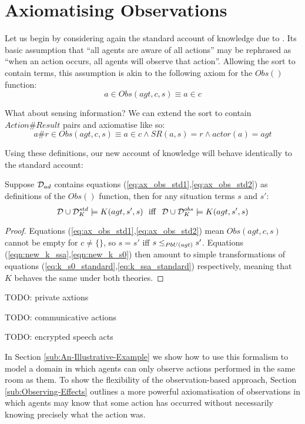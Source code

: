 \section{Axiomatising Observations}

Let us begin by considering again the standard account of knowledge
due to \citep{scherl03sc_knowledge}. Its basic assumption that {}``all
agents are aware of all actions'' may be rephrased as {}``when an
action occurs, all agents will observe that action''. Allowing the
 sort to contain  terms, this assumption
is akin to the following axiom for the $Obs()$ function:\begin{equation}
a\in Obs(agt,c,s)\equiv a\in c\label{eq:ax_obs_std1}\end{equation}


What about sensing information? We can extend the 
sort to contain $Action\#Result$ pairs and axiomatise like so:\begin{equation}
a\#r\in Obs(agt,c,s)\equiv a\in c\wedge SR(a,s)=r\wedge actor(a)=agt\label{eq:ax_obs_std2}\end{equation}


Using these definitions, our new account of knowledge will behave
identically to the standard account:

\begin{thm}
Suppose $\mathcal{D}_{ad}$ contains equations (\ref{eq:ax_obs_std1},\ref{eq:ax_obs_std2})
as definitions of the $Obs()$ function, then for any situation terms
$s$ and $s'$:\[
\mathcal{D}\cup\mathcal{D}_{K}^{std}\models K(agt,s',s)\,\,\,\,\mathrm{iff}\,\,\,\,\mathcal{D}\cup\mathcal{D}_{K}^{obs}\models K(agt,s',s)\]

\end{thm}
\begin{proof}
Equations (\ref{eq:ax_obs_std1},\ref{eq:ax_obs_std2}) mean $Obs(agt,c,s)$
cannot be empty for $c\neq\{\}$, so $s=s'$ iff $s\leq_{PbU(agt)}s'$.
Equations (\ref{eqn:new_k_ssa},\ref{eqn:new_k_s0}) then amount to
simple transformations of equations (\ref{eq:k_s0_standard},\ref{eq:k_ssa_standard})
respectively, meaning that $K$ behaves the same under both theories. 
\end{proof}
TODO: private axtions

TODO: communicative actions

TODO: encrypted speech acts

In Section \ref{sub:An-Illustrative-Example} we show how to use this
formalism to model a domain in which agents can only observe actions
performed in the same room as them. To show the flexibility of the
observation-based approach, Section \ref{sub:Observing-Effects} outlines
a more powerful axiomatisation of observations in which agents may
know that some action has occurred without necessarily knowing precisely
what the action was.


